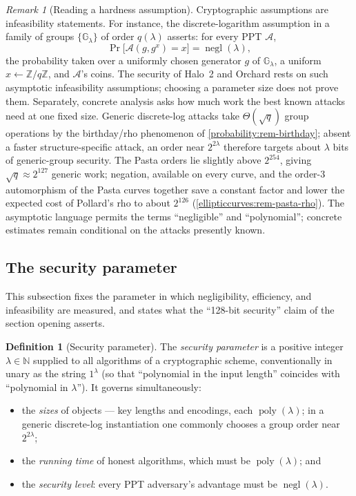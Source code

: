 \documentclass[11pt,a4paper]{article}
\theoremstyle{definition}
\newtheorem{definition}[theorem]{Definition}
\theoremstyle{remark}
\newtheorem{remark}[theorem]{Remark}
\newcommand{\N}{\ensuremath{\mathbb{N}}}
\newcommand{\Z}{\ensuremath{\mathbb{Z}}}
\newcommand{\G}{\ensuremath{\mathbb{G}}}
\DeclareMathOperator{\negl}{negl}
\DeclareMathOperator{\poly}{poly}
\newcommand{\Adv}{\ensuremath{\mathcal{A}}}
\begin{document}
\begin{remark}[Reading a hardness assumption]
\label{probability:rem-hardness}
Cryptographic assumptions are infeasibility statements. For instance,
the discrete-logarithm assumption in a family of groups
\(\{\G_\lambda\}\) of order \(q(\lambda)\) asserts: for every PPT
\(\Adv\),
\[
\Pr\bigl[\Adv(g, g^{x}) = x\bigr] = \negl(\lambda),
\]
the probability taken over a uniformly chosen generator \(g\) of
\(\G_\lambda\), a uniform \(x \gets \Z/q\Z\), and \(\Adv\)'s coins.
The security of Halo~2 and Orchard rests on such asymptotic
infeasibility assumptions; choosing a parameter size does not prove them.
Separately, concrete analysis asks how much work the best known attacks need
at one fixed size. Generic discrete-log attacks take
\(\Theta(\sqrt{q})\) group operations by the birthday/rho phenomenon of
\cref{probability:rem-birthday}; absent a faster structure-specific attack,
an order near \(2^{2\lambda}\) therefore targets about \(\lambda\) bits of
generic-group security. The Pasta orders lie slightly above \(2^{254}\), giving
\(\sqrt q \approx 2^{127}\) generic work; negation, available on every curve,
and the order-\(3\) automorphism of the Pasta curves together save a constant
factor and lower the expected cost of Pollard's rho to about \(2^{126}\)
(\cref{ellipticcurves:rem-pasta-rho}). The
asymptotic language permits the terms
``negligible'' and ``polynomial''; concrete estimates remain conditional on
the attacks presently known.
\end{remark}

\subsection{The security parameter}\label{probability:sub-secparam}

This subsection fixes the parameter in which negligibility, efficiency,
and infeasibility are measured, and states what the ``128-bit
security'' claim of the section opening asserts.

\begin{definition}[Security parameter]\label{probability:def-secparam}
The \emph{security parameter} is a positive integer
\(\lambda \in \N\) supplied to all algorithms of a cryptographic
scheme, conventionally in unary as the string \(1^\lambda\) (so that
``polynomial in the input length'' coincides with ``polynomial in
\(\lambda\)''). It governs simultaneously:
\begin{itemize}
\item the \emph{sizes} of objects --- key lengths and encodings, each
  \(\poly(\lambda)\); in a generic discrete-log instantiation one commonly
  chooses a group order near \(2^{2\lambda}\);
\item the \emph{running time} of honest algorithms, which must be
  \(\poly(\lambda)\); and
\item the \emph{security level}: every PPT adversary's advantage must
  be \(\negl(\lambda)\).
\end{itemize}
\end{definition}
\end{document}
